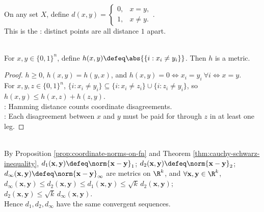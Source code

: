 \begin{example} \label{ex:discrete-metric} \\
On any set $X$, define $d(x,y)=
\begin{cases}
0, & x=y,\\
1, & x\neq y.
\end{cases}$.\\
This is the : distinct points are all distance $1$ apart.
\end{example}

\begin{example} \label{ex:hamming-distance} \\
For $x,y\in\{0,1\}^n$, define $h(x,y)\defeq\abs{\{i:x_i\neq y_i\}}$. Then $h$ is a metric.
\begin{proof}
$h\geq0$, $h(x,y)=h(y,x)$, and $h(x,y)=0\Longleftrightarrow x_i=y_i\ \forall i\Longleftrightarrow x=y$.\\
For $x,y,z\in\{0,1\}^n$, $\{i:x_i\neq y_i\}\subseteq\{i:x_i\neq z_i\}\cup\{i:z_i\neq y_i\}$, so $h(x,y)\leq h(x,z)+h(z,y)$.\\
: Hamming distance counts coordinate disagreements.\\
: Each disagreement between $x$ and $y$ must be paid for through $z$ in at least one leg.
\end{proof}
\end{example}

\begin{example} \label{ex:coordinate-norm-metrics-rk} \\
By Proposition \ref{prop:coordinate-norms-on-fn} and Theorem \ref{thm:cauchy-schwarz-inequality}, $d_1(\mathbf{x},\mathbf{y})\defeq\norm{\mathbf{x}-\mathbf{y}}_1$; $d_2(\mathbf{x},\mathbf{y})\defeq\norm{\mathbf{x}-\mathbf{y}}_2$; $d_\infty(\mathbf{x},\mathbf{y})\defeq\norm{\mathbf{x}-\mathbf{y}}_\infty$ are metrics on $\R^k$, and $\forall \mathbf{x},\mathbf{y}\in\R^k$, $d_\infty(\mathbf{x},\mathbf{y})\leq d_2(\mathbf{x},\mathbf{y})\leq d_1(\mathbf{x},\mathbf{y})\leq \sqrt{k}\,d_2(\mathbf{x},\mathbf{y})$; $d_2(\mathbf{x},\mathbf{y})\leq \sqrt{k}\,d_\infty(\mathbf{x},\mathbf{y})$.\\
Hence $d_1,d_2,d_\infty$ have the same convergent sequences.
\end{example}

